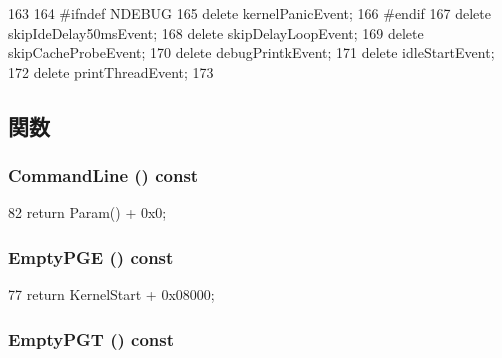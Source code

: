 \begin{DoxyCode}
163 {
164 #ifndef NDEBUG
165     delete kernelPanicEvent;
166 #endif
167     delete skipIdeDelay50msEvent;
168     delete skipDelayLoopEvent;
169     delete skipCacheProbeEvent;
170     delete debugPrintkEvent;
171     delete idleStartEvent;
172     delete printThreadEvent;
173 }
\end{DoxyCode}


\subsection{関数}
\hypertarget{classLinuxAlphaSystem_abcf63fc8eb1c5516fa32ca30a8fa11de}{
\subsubsection[{CommandLine}]{ CommandLine () const}}
\label{classLinuxAlphaSystem_abcf63fc8eb1c5516fa32ca30a8fa11de}



\begin{DoxyCode}
82 { return Param() + 0x0; }
\end{DoxyCode}
\hypertarget{classLinuxAlphaSystem_afd9b1bf6ab7fce16a7fb5fbee207c7fb}{
\subsubsection[{EmptyPGE}]{ EmptyPGE () const}}
\label{classLinuxAlphaSystem_afd9b1bf6ab7fce16a7fb5fbee207c7fb}



\begin{DoxyCode}
77 { return KernelStart + 0x08000; }
\end{DoxyCode}
\hypertarget{classLinuxAlphaSystem_a2259d56c0c0084560828cefba4f46c0a}{
\subsubsection[{EmptyPGT}]{ EmptyPGT () const}}
\label{classLinuxAlphaSystem_a2259d56c0c0084560828cefba4f46c0a}




